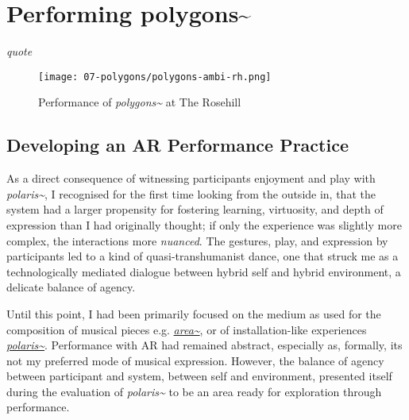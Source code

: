 \chapter{Performing polygons\textasciitilde{}}
\label{sec: polygons}
\epigraph{\emph{quote}}{\citep[]{bilbow2022}}
\begin{figure}
    \centering
    \texttt{[image: 07-polygons/polygons-ambi-rh.png]}
    \caption{Performance of \textit{polygons\textasciitilde{}} at The Rosehill}
    \label{fig: polygons-ambi-rh}
\end{figure}
\section{Developing an AR Performance Practice} \label{sec: polygons-developing}
As a direct consequence of witnessing participants enjoyment and play with \textit{polaris\textasciitilde{}}, I recognised for the first time looking from the outside in, that the system had a larger propensity for fostering learning, virtuosity, and depth of expression than I had originally thought; if only the experience was slightly more complex, the interactions more \textit{nuanced}. The gestures, play, and expression by participants led to a kind of quasi-transhumanist dance, one that struck me as a technologically mediated dialogue between hybrid self and hybrid environment, a delicate balance of agency.

Until this point, I had been primarily focused on the medium as used for the composition of musical pieces e.g. \hyperref[sec: area]{\textit{area\textasciitilde{}}}, or of installation-like experiences \hyperref[sec: polaris]{\textit{polaris\textasciitilde{}}}. Performance with AR had remained abstract, especially as, formally, its not my preferred mode of musical expression. However, the balance of agency between participant and system, between self and environment, presented itself during the evaluation of \textit{polaris\textasciitilde{}} to be an area ready for exploration through performance. 

